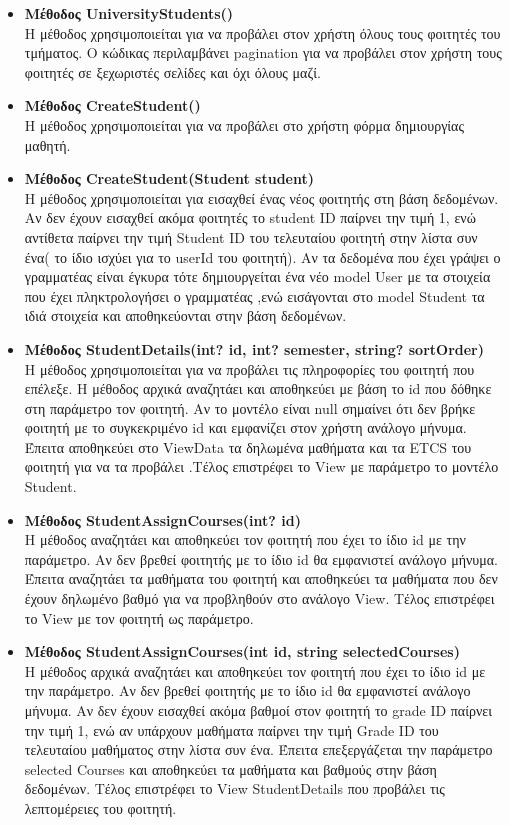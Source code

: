 \documentclass[12pt]{article}
\begin{document}
\begin{itemize}
		\item \textbf{Μέθοδος UniversityStudents()}\\
		Η μέθοδος χρησιμοποιείται για να προβάλει στον χρήστη όλους τους φοιτητές του τμήματος. Ο κώδικας περιλαμβάνει pagination για να προβάλει στον χρήστη τους φοιτητές σε ξεχωριστές σελίδες και όχι όλους μαζί. 
		
		\item \textbf{Μέθοδος CreateStudent()}\\
		Η μέθοδος χρησιμοποιείται για να προβάλει στο χρήστη φόρμα δημιουργίας μαθητή.
							
		\item \textbf{Μέθοδος CreateStudent(Student student)}\\
		Η μέθοδος χρησιμοποιείται για εισαχθεί ένας νέος φοιτητής στη βάση δεδομένων. Αν δεν έχουν εισαχθεί ακόμα φοιτητές το  student ID παίρνει την τιμή 1, ενώ αντίθετα παίρνει την τιμή Student ID του τελευταίου φοιτητή στην λίστα συν ένα( το ίδιο ισχύει για το userId του φοιτητή). Αν τα δεδομένα που έχει γράψει ο γραμματέας είναι έγκυρα τότε δημιουργείται ένα νέο model User με τα στοιχεία που έχει πληκτρολογήσει ο γραμματέας ,ενώ εισάγονται στο model Student τα ιδιά στοιχεία και αποθηκεύονται στην βάση δεδομένων.
		
		\item \textbf{Μέθοδος StudentDetails(int? id, int? semester, string? sortOrder)}\\
		Η μέθοδος χρησιμοποιείται για να προβάλει τις πληροφορίες του φοιτητή που επέλεξε. Η μέθοδος αρχικά αναζητάει και αποθηκεύει με βάση το id που δόθηκε στη παράμετρο τον φοιτητή. Αν το μοντέλο είναι null σημαίνει ότι δεν βρήκε φοιτητή με το συγκεκριμένο id και εμφανίζει στον χρήστη ανάλογο μήνυμα. Έπειτα αποθηκεύει στο ViewData τα δηλωμένα μαθήματα και τα ETCS του φοιτητή για να τα προβάλει .Τέλος επιστρέφει το View με παράμετρο το μοντέλο Student.
			
		\item \textbf{Μέθοδος StudentAssignCourses(int? id)}\\
		Η μέθοδος αναζητάει και αποθηκεύει τον φοιτητή που έχει το ίδιο id με την παράμετρο. Αν δεν βρεθεί φοιτητής με το ίδιο id θα εμφανιστεί ανάλογο μήνυμα. Έπειτα αναζητάει τα μαθήματα του φοιτητή και αποθηκεύει τα μαθήματα που δεν έχουν δηλωμένο βαθμό για να προβληθούν στο ανάλογο View. Τέλος επιστρέφει το View με τον φοιτητή ως παράμετρο.
				
		\item \textbf{Μέθοδος StudentAssignCourses(int id, string selectedCourses)}\\
		Η μέθοδος αρχικά αναζητάει και αποθηκεύει τον φοιτητή που έχει το ίδιο id με την παράμετρο. Αν δεν βρεθεί φοιτητής με το ίδιο id θα εμφανιστεί ανάλογο μήνυμα. Αν δεν έχουν εισαχθεί ακόμα βαθμοί στον φοιτητή το  grade ID παίρνει την τιμή 1, ενώ αν υπάρχουν μαθήματα παίρνει την τιμή Grade ID του τελευταίου μαθήματος στην λίστα συν ένα. Έπειτα επεξεργάζεται την παράμετρο selected Courses και αποθηκεύει τα μαθήματα και βαθμούς στην βάση δεδομένων. Τέλος επιστρέφει το View StudentDetails που προβάλει τις λεπτομέρειες του φοιτητή.
		

\end{itemize}
\end{document}

